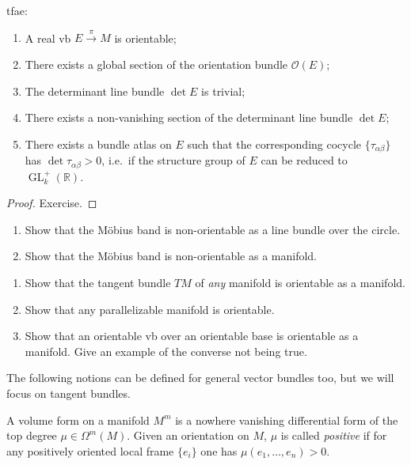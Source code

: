 \documentclass[english,letterpaper]{article}%
\numberwithin{equation}{section}
\numberwithin{figure}{section}
\numberwithin{table}{section}
\theoremstyle{definition}
\theoremstyle{definition}
\theoremstyle{definition}
\theoremstyle{plain}
\theoremstyle{plain}
\theoremstyle{plain}
\theoremstyle{plain}
\theoremstyle{remark}
\theoremstyle{remark}
\DeclareMathOperator{\GL}{GL}
\begin{document}
\begin{prop}
\gls{tfae}:
\begin{enumerate}
    \item A real \gls{vb} $E\overset\pi\to M$ is orientable;
    \item There exists a global section of the orientation bundle $\mathcal{O}(E)$;
    \item The determinant line bundle $\det E$ is trivial;
    \item There exists a non-vanishing section of the determinant line bundle $\det E$;
    \item There exists a bundle atlas on $E$ such that the corresponding cocycle $\{\tau_{\alpha\beta}\}$ has $\det\tau_{\alpha\beta}>0$, i.e.\ if the structure group of $E$ can be reduced to $\GL^+_k(\mathbb{R})$.
\end{enumerate}
\end{prop}
\begin{proof}
Exercise.
\end{proof}

\begin{xca}
\begin{enumerate}
    \item Show that the M\"obius band is non-orientable as a line bundle over the circle.
    \item Show that the M\"obius band is non-orientable as a manifold.
\end{enumerate}
\end{xca}

\begin{xca}
\begin{enumerate}
    \item Show that the tangent bundle $TM$ of \emph{any} manifold is orientable as a manifold.
    \item Show that any parallelizable manifold is orientable.
    \item Show that an orientable \gls{vb} over an orientable base is orientable as a manifold. Give an example of the converse not being true.
\end{enumerate}
\end{xca}

The following notions can be defined for general vector bundles too, but we will focus on tangent bundles.

\begin{defn}
A volume form on a manifold $M^m$ is a nowhere vanishing differential form of the top degree $\mu\in \Omega^m(M)$. Given an orientation on $M$, $\mu$ is called \emph{positive} if for any positively oriented local frame $\{e_i\}$ one has $\mu(e_1,\ldots,e_n)>0$.
\end{defn}
\end{document}
